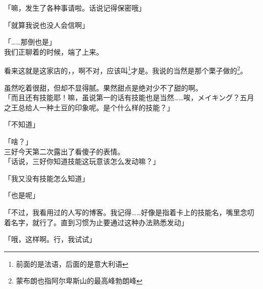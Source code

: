 「嘛，发生了各种事请啦。话说记得保密哦」

「就算我说也没人会信啊」

「……那倒也是」\\

我们正聊着的时候，端了上来。

看来这就是这家店的，，啊不对，应该叫\footnote{前面的是法语，后面的是意大利语}才是。我说的当然是那个栗子做的\footnote{蒙布朗也指阿尔卑斯山的最高峰勃朗峰}。

虽然吃着很甜，但却不显得腻。果然甜点是绝对少不了甜的啊。\\

「而且还有技能耶！嘛，虽说第一的话有技能也是当然……唉，メイキング？五月之王总给人一种土豆的印象呢。是个什么样的技能？」

「不知道」

「啥？」\\

三好今天第二次露出了看傻子的表情。\\

「话说，三好你知道技能这玩意该怎么发动嘛？」

「我又没有技能怎么知道」

「也是呢」

「不过，我看用过的人写的博客。我记得……好像是指着卡上的技能名，嘴里念叨着名字，就行了。直到习惯为止要通过这种办法熟悉发动」

「哦，这样啊。行，我试试」

